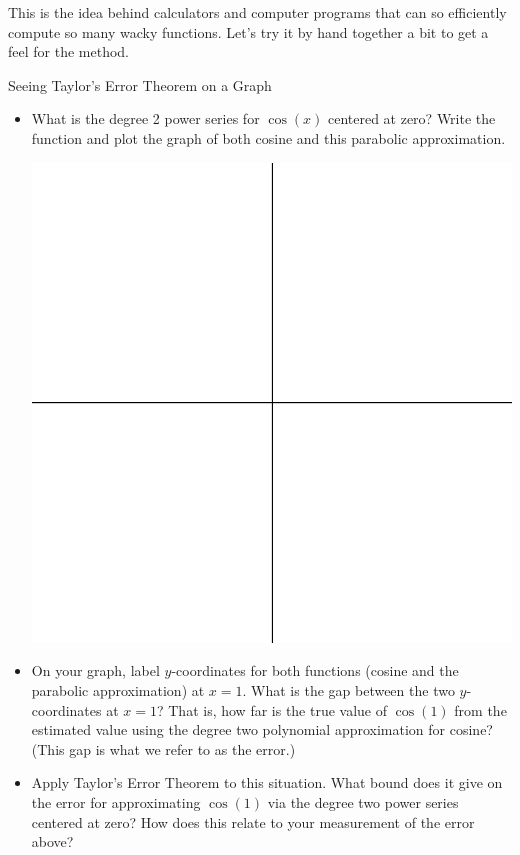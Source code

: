 This is the idea behind calculators and computer programs that can so efficiently compute so many wacky functions.  Let's try it by hand together a bit to get a feel for the method.

\begin{exercise}{Seeing Taylor's Error Theorem on a Graph \Coffeecup \Coffeecup}
\begin{itemize}
\item What is the degree 2 power series for $\cos(x)$ centered at zero?  Write the function and plot the graph of both cosine and this parabolic approximation.

\begin{center}
\includegraphics[scale=0.5]{quadall}
\end{center}

\item On your graph, label $y$-coordinates for both functions (cosine and the parabolic approximation) at $x=1$.  What is the gap between the two $y$-coordinates at $x=1$?  That is, how far is the true value of $\cos(1)$ from the estimated value using the degree two polynomial approximation for cosine?  (This gap is what we refer to as the error.)  

\item Apply Taylor's Error Theorem to this situation.  What bound does it give on the error for approximating $\cos(1)$ via the degree two power series centered at zero?  How does this relate to your measurement of the error above?


\end{itemize}
\end{exercise}
